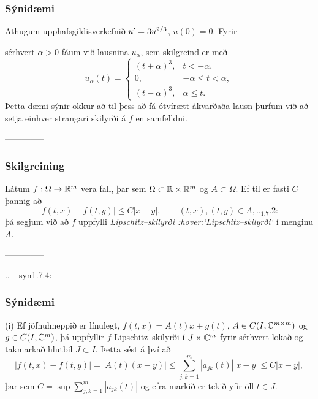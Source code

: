 \subsubsection{Sýnidæmi}
\hfill Athugum upphafsgildisverkefnið
$u{\sp{\prime}}=3u^{2/3}$, $u(0)=0$.  Fyrir 


 {}
\noindent sérhvert $\alpha>0$ fáum við
lausnina $u_\alpha$, sem skilgreind er með
 $$
 u_\alpha(t)=\begin{cases}
(t+\alpha)^3, &t<-\alpha,\\
0, &-\alpha\leq t<\alpha,\\
(t-\alpha)^3, &\alpha\leq t.
\end{cases}
 $$
Þetta dæmi sýnir okkur að til
þess að fá ótvírætt ákvarðaða lausn þurfum við að setja einhver
strangari skilyrði á $f$ en samfelldni.


--------------



\subsubsection{Skilgreining}{}
Látum  $f:\Omega\to{\mathbb R}^m$ vera fall, þar sem  $\Omega\subset {\mathbb R}\times
{\mathbb R}^m$  og $A\subset \Omega$.
Ef til er fasti $C$ þannig að 
 \begin{equation*}|f(t,x)-f(t,y)|\leq C|x-y|,\qquad (t,x), (t,y)\in
 A,

.. _1.7.2:
 
 \end{equation*}
þá segjum við að $f$ uppfylli {\it
Lipschitz--skilyrði :hover:`Lipschitz--skilyrði`} í menginu $A$.


--------------




.. _syn1.7.4:

\subsubsection{Sýnidæmi} (i) Ef jöfnuhneppið er línulegt, $f(t,x)=A(t)x+g(t)$,
$A\in C(I,{\mathbb C}^{m\times m})$ og $g\in C(I,{\mathbb C}^m)$, þá uppfyllir $f$
Lipschitz--skilyrði í $J\times {\mathbb C}^m$ fyrir sérhvert lokað og
takmarkað hlutbil $J\subset I$. Þetta sést á því að 
 $$|f(t,x)-f(t,y)|=|A(t)(x-y)|
\leq \sum\limits_{j,k=1}^m |a_{jk}(t)||x-y|\leq C|x-y|,
 $$
þar sem $C=\sup\sum\limits_{j,k=1}^m |a_{jk}(t)|$ 
og efra markið er tekið yfir öll $t\in J$.

